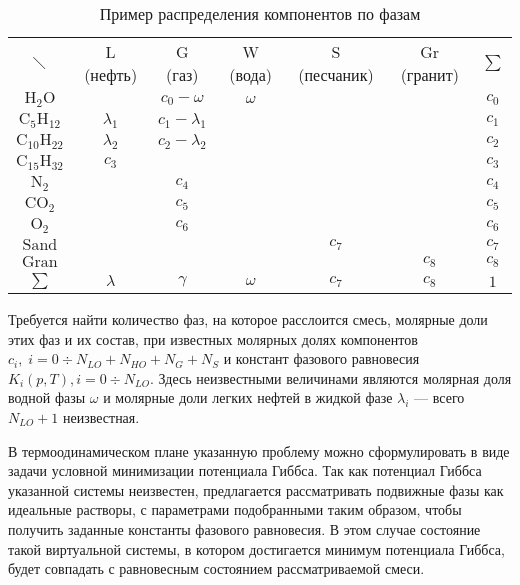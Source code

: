 \documentclass[12pt]{article}
\let\dividesymbol\div
\renewcommand{\div}{\operatorname{div}}
\begin{document}
\begin{table}[ht!]
\centering
\begin{tabular}{c|c|c|c|c|c|c}
\multicolumn{1}{c}{$\diagdown$}& \multicolumn{1}{c}{L (нефть)}& \multicolumn{1}{c}{G (газ)}& \multicolumn{1}{c}{W
(вода)}& \multicolumn{1}{c}{S (песчаник)}& Gr (гранит)&
$\sum$\\
\cline{2-6}
$\mathrm{H_2O}$& & $c_0 - \omega$ & $\omega$ & & & $c_0$\\
\cline{1-6}
$\mathrm{C_5H_{12}}$& $\lambda_1$ & $c_1 - \lambda_1$ & & & & $c_1$\\
\cline{2-6}
$\mathrm{C_{10}H_{22}}$& $\lambda_2$ & $c_2 - \lambda_2$ & & & & $c_2$\\
\cline{1-6}
$\mathrm{C_{15}H_{32}}$& $c_3$ & & & & & $c_3$\\
\cline{1-6}
$\mathrm{N_2}$& & $c_4$ & & & & $c_4$\\
\cline{2-6}
$\mathrm{CO_2}$& & $c_5$ & & & & $c_5$\\
\cline{2-6}
$\mathrm{O_2}$& & $c_6$ & & & & $c_6$\\
\cline{1-6}
$\mathrm{Sand}$& & & & $c_7$ & & $c_7$\\
\cline{2-6}
$\mathrm{Gran}$& & & & & $c_8$ & $c_8$\\
\cline{1-6} \multicolumn{1}{c}{$\sum$}& \multicolumn{1}{c}{$\lambda$}& \multicolumn{1}{c}{$\gamma$}&
\multicolumn{1}{c}{$\omega$}& \multicolumn{1}{c}{$c_7$}& \multicolumn{1}{c}{$c_8$}&
\multicolumn{1}{c}{$1$}\\
\end{tabular}
\caption{Пример распределения компонентов по фазам} \label{t:compphases}
\end{table}

Требуется найти количество фаз, на которое расслоится смесь, молярные доли этих фаз и их состав, при известных молярных долях компонентов $c_i, \; i = 0 \dividesymbol N_{LO} + N_{HO} + N_{G} + N_{S}$ и констант фазового равновесия $K_i (p, T), i = 0 \dividesymbol N_{LO} $. Здесь неизвестными величинами являются молярная доля водной фазы $ \omega $ и молярные доли легких нефтей в жидкой фазе $ \lambda_i $ --- всего $N_{LO} + 1$ неизвестная.

В термоодинамическом плане указанную проблему можно сформулировать в виде задачи условной минимизации потенциала Гиббса. Так как потенциал Гиббса указанной системы неизвестен, предлагается рассматривать подвижные фазы как идеальные растворы, с параметрами подобранными таким образом, чтобы получить заданные константы фазового равновесия. В этом случае состояние такой виртуальной системы, в котором достигается минимум потенциала Гиббса, будет совпадать с равновесным состоянием рассматриваемой смеси.
\end{document}
